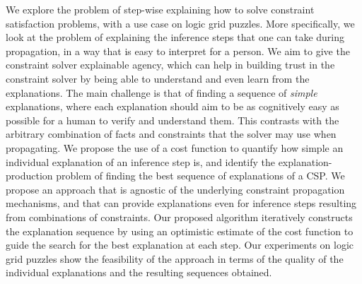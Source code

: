 We explore the problem of step-wise explaining how to solve constraint satisfaction problems, with a use case on logic grid puzzles. More specifically, we look at the problem of explaining the inference steps that one can take during propagation, in a way that is easy to interpret for a person. We aim to give the constraint solver explainable agency, which can help in building trust in the constraint solver by being able to understand and even learn from the explanations.
The main challenge is that of finding a sequence of \textit{simple} explanations, where each explanation should aim to be as cognitively easy as possible for a human to verify and understand them. This contrasts with the arbitrary combination of facts and constraints that the solver may use when propagating. %
We propose the use of a cost function to quantify how simple an individual explanation of an inference step is, and identify the explanation-production problem of finding the best sequence of explanations of a CSP. 
We propose an approach that is agnostic of the underlying constraint propagation mechanisms, and that can provide explanations even for inference steps resulting from combinations of constraints.
Our proposed algorithm iteratively constructs the explanation sequence by using an optimistic estimate of the cost function to guide the search for the best explanation at each step.
Our experiments on logic grid puzzles show the feasibility of the approach in terms of the quality of the individual explanations and the resulting sequences obtained.